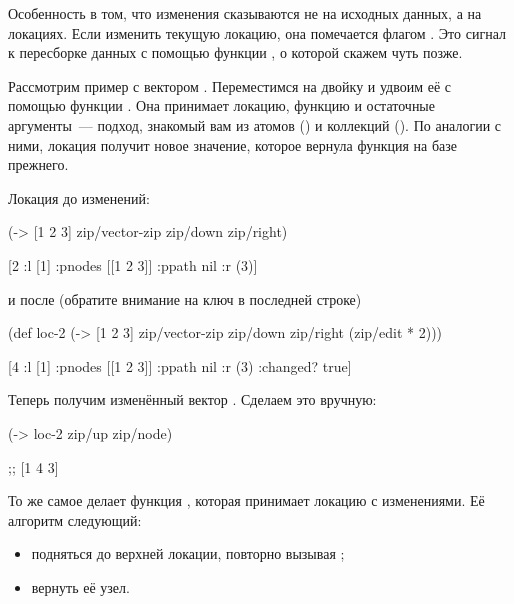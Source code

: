Особенность в том, что изменения сказываются не на исходных данных, а на
локациях. Если изменить текущую локацию, она помечается флагом . Это
сигнал к пересборке данных с помощью функции , о которой скажем чуть
позже.

Рассмотрим пример с вектором \code{[1 2 3]}. Переместимся на двойку и удвоим её с
помощью функции . Она принимает локацию, функцию и остаточные
аргументы~--- подход, знакомый вам из атомов () и коллекций (). По
аналогии с ними, локация получит новое значение, которое вернула функция на базе
прежнего.

Локация до изменений:

\begin{english}
  \begin{clojure}
(-> [1 2 3]
    zip/vector-zip
    zip/down
    zip/right)

[2 {:l [1] :pnodes [[1 2 3]] :ppath nil :r (3)}]
  \end{clojure}
\end{english}

\noindent
и после (обратите внимание на ключ  в последней строке)

\begin{english}
  \begin{clojure}
(def loc-2
  (-> [1 2 3]
      zip/vector-zip
      zip/down
      zip/right
      (zip/edit * 2)))

[4 {:l [1] :pnodes [[1 2 3]] :ppath nil :r (3)
    :changed? true}]
  \end{clojure}
\end{english}

Теперь получим изменённый вектор \code{[1 4 3]}. Сделаем это вручную:

\begin{english}
  \begin{clojure}
(-> loc-2
    zip/up
    zip/node)

;; [1 4 3]
  \end{clojure}
\end{english}

То же самое делает функция , которая принимает локацию с
изменениями. Её алгоритм следующий:

\begin{itemize}

\item
  подняться до верхней локации, повторно вызывая ;

\item
  вернуть её узел.

\end{itemize}

